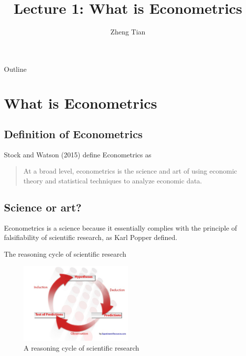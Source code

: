 \documentclass[presentation]{beamer}
\author{Zheng Tian}
\date{}
\title{Lecture 1: What is Econometrics}
\begin{document}
\maketitle
\begin{frame}{Outline}
\setcounter{tocdepth}{1}
\tableofcontents
\end{frame}


\section*{What is Econometrics}
\label{sec:orgb014773}

\subsection*{Definition of Econometrics}
\label{sec:org10804f8}

Stock and Watson (2015) define Econometrics as

\begin{quote}
At a broad level, econometrics is the science and art of using
economic theory and statistical techniques to analyze economic
data.
\end{quote}


\subsection*{Science or art?}
\label{sec:orgece27f2}

Econometrics is a science because it essentially complies with the
principle of \alert{falsifiability} of scientific research, as Karl Popper
defined.

\begin{frame}[label={sec:org24587a5}]{The reasoning cycle of scientific research}
\begin{figure}[htbp]
\centering
\includegraphics[width=0.5\textwidth]{figure/reasoning-cycle-research.jpg}
\caption{A reasoning cycle of scientific research}
\end{figure}
\end{frame}
\end{document}
